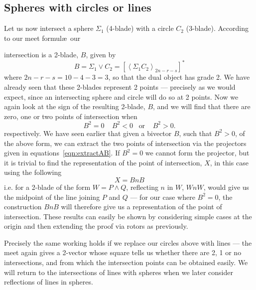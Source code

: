 
\subsection{Spheres with circles or lines}

Let us now intersect a sphere $\Sigma_1$ (4-blade) with a
circle $C_2$ (3-blade). According to our meet formul\ae\ our

intersection is a 2-blade, $B$, given by
%
\begin{equation}
B = \Sigma_1 \vee C_2 = \left[\left< \Sigma_1 C_2
\right>_{2n-r-s}\right]^*
\end{equation}
%
where $2n-r-s=10-4-3=3$, so that the dual object has
grade 2. We have already seen that these 2-blades
represent 2 points --- precisely as we would expect, since
an intersecting sphere and circle will do so at 2 points.
Now we again look at the sign of the resulting 2-blade,
$B$, and we will find that there are zero, one or two
points of intersection when
%
\[  B^2=0 \;\;\;\; B^2<0 \;\;\;\mbox{or}\;\;\;\; B^2>0.
\]
%
respectively.
We have seen earlier that given a bivector $B$, such that
$B^2>0$, of the above form, we can extract the two points
of intersection via the projectors given in
equations~\ref{eqn:extractAB}. If $B^2=0$ we cannot form
the projector, but it is trivial to find the representation of the point of
intersection, $X$, in this case using the following
%
\[  X = BnB  \]
%
i.e. for a 2-blade of the form $W = P\wedge Q$, reflecting
$n$ in $W$, $WnW$, would give us the midpoint of the line
joining $P$ and $Q$ --- for our case where $B^2=0$, the
construction $BnB$ will therefore give us a representation of the point of
intersection. These results can easily be shown by
considering simple cases at the origin and then extending
the proof via rotors as previously.

Precisely the same working holds if we replace our
circles above with lines --- the meet again gives a
2-vector whose square tells us whether there are 2, 1 or
no intersections, and from which the intersection points
can be obtained easily. We will return to the
intersections of lines with spheres when we later
consider reflections of lines in spheres.





